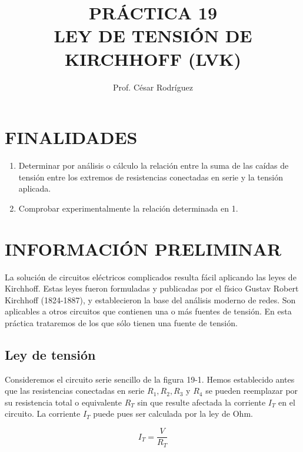 \documentclass{article}
\begin{document}
\title{PRÁCTICA 19 \\ LEY DE TENSIÓN DE KIRCHHOFF (LVK)}
\author{Prof. César Rodríguez}
\date{}
\maketitle

\tableofcontents
\newpage

\listoffigures
\newpage

\listoftables
\newpage

\section{FINALIDADES}
\begin{enumerate}
    \item Determinar por análisis o cálculo la relación entre la suma de las caídas de tensión entre los extremos de resistencias conectadas en serie y la tensión aplicada.
    \item Comprobar experimentalmente la relación determinada en 1.
\end{enumerate}

\section{INFORMACIÓN PRELIMINAR}
La solución de circuitos eléctricos complicados resulta fácil aplicando las leyes de Kirchhoff. Estas leyes fueron formuladas y publicadas por el físico Gustav Robert Kirchhoff (1824-1887), y establecieron la base del análisis moderno de redes. Son aplicables a otros circuitos que contienen una o más fuentes de tensión. En esta práctica trataremos de los que sólo tienen una fuente de tensión.

\subsection{Ley de tensión}
Consideremos el circuito serie sencillo de la figura 19-1. Hemos establecido antes que las resistencias conectadas en serie $R_1, R_2, R_3$ y $R_4$ se pueden reemplazar por su resistencia total o equivalente $R_T$ sin que resulte afectada la corriente $I_T$ en el circuito. La corriente $I_T$ puede pues ser calculada por la ley de Ohm.

\begin{equation}
    I_T = \frac{V}{R_T}
\end{equation}
\end{document}
